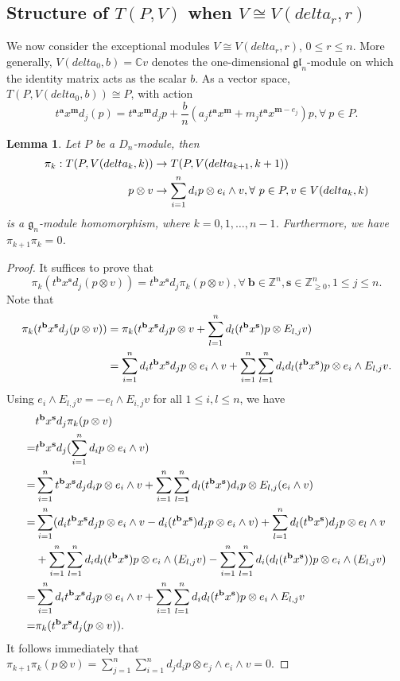 \documentclass[12pt,a4paper]{amsart}
\def\mg{g}%
\def\gl{gl}%
\def\delta{delta}%
\newtheorem{lemma}[theorem]{Lemma}%
\numberwithin{equation}{section}
\newcommand{\Z}{\mathbb{Z}}
\def\mg{\mathfrak{g}}
\def\gl{\mathfrak{gl}}
\def\ba{\mathbf{a}}
\def\bs{\mathbf{s}}
\def\bm{\mathbf{m}}
\def\bb{\mathbf{b}}
\begin{document}
\subsection{Structure of $T(P,V)$ when $V\cong  V(\delta_{r},r)$ }

We now consider the exceptional modules
\(V\cong V(\delta_r,r)\), \(0\leq r\leq n\). More generally,
\(V(\delta_0,b)=\mathbb Cv\) denotes the one-dimensional
\(\gl_n\)-module on which the identity matrix acts as the scalar \(b\).
As a vector space, \(T(P,V(\delta_0,b))\cong P\), with action
$$t^{\ba}x^{\bm}d_j(p)=t^{\ba}x^{\bm}d_jp+\frac{b}{n}(a_jt^{\ba}x^{\bm}+m_jt^{\ba}x^{\bm-e_j})p, \forall\ p\in P.$$

\begin{lemma}\label{homomorphismpi}
Let $P$ be a $D_n$-module, then
$$\aligned
\pi_k: T(P,V(\delta_k,k)) &\rightarrow T(P,V(\delta_{k+1},k+1))\\
p\otimes v &\rightarrow \sum^n_{i=1}d_ip\otimes e_i \wedge v, \forall\ p\in P, v\in V(\delta_k,k)
\endaligned$$
is a $\mg_n$-module homomorphism, where $k=0,1,\dots, n-1$. Furthermore, we have $\pi_{k+1}\pi_{k}=0$.
\end{lemma}

\begin{proof}
It suffices to prove that
$$\pi_k(t^{\bb}x^{\bs}d_j(p\otimes v))=t^{\bb}x^{\bs}d_j\pi_k(p\otimes v), \forall\ \bb\in \Z^n, \bs\in \Z^n_{\geq0}, 1\leq j\leq n.$$
Note that
$$\aligned
\pi_k(t^{\bb}x^{\bs}d_j(p\otimes v))&=\pi_k(t^{\bb}x^{\bs}d_jp\otimes v+\sum^n_{l=1}d_l(t^{\bb}x^{\bs})p\otimes E_{l,j}v)\\
&=\sum^n_{i=1}d_it^{\bb}x^{\bs}d_jp\otimes e_i\wedge v+\sum^n_{i=1}\sum^n_{l=1}d_id_l(t^{\bb}x^{\bs})p\otimes e_i\wedge E_{l,j}v.
\endaligned$$
Using $e_i\wedge E_{l,j}v=-e_l\wedge E_{i,j}v$ for all $1\leq i,l\leq n$, we have
$$\aligned
&t^{\bb}x^{\bs}d_j\pi_k(p\otimes v)\\
=&t^{\bb}x^{\bs}d_j(\sum^n_{i=1}d_ip\otimes e_i \wedge v)\\
=&\sum^n_{i=1}t^{\bb}x^{\bs}d_jd_ip\otimes e_i \wedge v+\sum^n_{i=1}\sum^n_{l=1}d_l(t^{\bb}x^{\bs})d_i p\otimes E_{l,j}(e_i\wedge v)\\
=&\sum^n_{i=1}(d_it^{\bb}x^{\bs}d_jp\otimes e_i \wedge v-d_i(t^{\bb}x^{\bs})d_j p\otimes e_i \wedge v)+\sum^n_{l=1}d_l(t^{\bb}x^{\bs})d_jp\otimes e_l\wedge v\\
&+\sum^n_{i=1}\sum^n_{l=1}d_id_l(t^{\bb}x^{\bs})p\otimes e_i\wedge(E_{l,j}v)-\sum^n_{i=1}\sum^n_{l=1}d_i(d_l(t^{\bb}x^{\bs}))p\otimes e_i\wedge(E_{l,j}v)\\
=&\sum^n_{i=1}d_it^{\bb}x^{\bs}d_jp\otimes e_i\wedge v+\sum^n_{i=1}\sum^n_{l=1}d_id_l(t^{\bb}x^{\bs})p\otimes e_i\wedge E_{l,j}v\\
=&\pi_k(t^{\bb}x^{\bs}d_j(p\otimes v)).
\endaligned$$
It follows immediately that
\(\pi_{k+1}\pi_k(p\otimes v)
=\sum_{j=1}^n\sum_{i=1}^n d_jd_ip\otimes
e_j\wedge e_i\wedge v=0\).
\end{proof}
\end{document}
